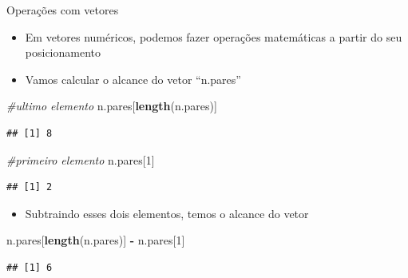 \documentclass[
  10pt,
  ignorenonframetext,
]{beamer}
\newenvironment{Shaded}{\begin{snugshade}}{\end{snugshade}}
\newcommand{\CommentTok}[1]{\textcolor[rgb]{0.56,0.35,0.01}{\textit{#1}}}
\newcommand{\DecValTok}[1]{\textcolor[rgb]{0.00,0.00,0.81}{#1}}
\newcommand{\KeywordTok}[1]{\textcolor[rgb]{0.13,0.29,0.53}{\textbf{#1}}}
\newcommand{\NormalTok}[1]{#1}
\newcommand{\OperatorTok}[1]{\textcolor[rgb]{0.81,0.36,0.00}{\textbf{#1}}}
\newcommand{\StringTok}[1]{\textcolor[rgb]{0.31,0.60,0.02}{#1}}
\providecommand{\tightlist}{%
  \setlength{\itemsep}{0pt}\setlength{\parskip}{0pt}}
\begin{document}
\begin{frame}[fragile]{Operações com vetores}
\protect\hypertarget{operauxe7uxf5es-com-vetores}{}
\begin{itemize}
\tightlist
\item
  Em vetores numéricos, podemos fazer operações matemáticas a partir do
  seu posicionamento
\item
  Vamos calcular o alcance do vetor ``n.pares''
\end{itemize}

\begin{Shaded}
\begin{Highlighting}[]
\CommentTok{\#ultimo elemento }
\NormalTok{n.pares[}\KeywordTok{length}\NormalTok{(n.pares)]}
\end{Highlighting}
\end{Shaded}

\begin{verbatim}
## [1] 8
\end{verbatim}

\begin{Shaded}
\begin{Highlighting}[]
\CommentTok{\#primeiro elemento}
\NormalTok{n.pares[}\DecValTok{1}\NormalTok{]}
\end{Highlighting}
\end{Shaded}

\begin{verbatim}
## [1] 2
\end{verbatim}

\begin{itemize}
\tightlist
\item
  Subtraindo esses dois elementos, temos o alcance do vetor
\end{itemize}

\begin{Shaded}
\begin{Highlighting}[]
\NormalTok{n.pares[}\KeywordTok{length}\NormalTok{(n.pares)] }\OperatorTok{{-}}\StringTok{ }\NormalTok{n.pares[}\DecValTok{1}\NormalTok{]}
\end{Highlighting}
\end{Shaded}

\begin{verbatim}
## [1] 6
\end{verbatim}
\end{frame}
\end{document}
